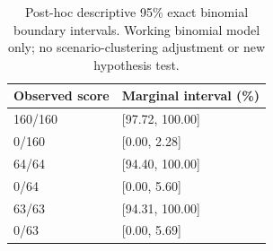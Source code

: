 \begin{table}[t]
\centering
\caption{Post-hoc descriptive 95\% exact binomial boundary intervals. Working binomial model only; no scenario-clustering adjustment or new hypothesis test.}
\label{tab:s-marginal}
\begin{tabular}{@{}ll@{}}
\toprule
Observed score & Marginal interval (\%) \\
\midrule
160/160 & [97.72, 100.00] \\
0/160 & [0.00, 2.28] \\
64/64 & [94.40, 100.00] \\
0/64 & [0.00, 5.60] \\
63/63 & [94.31, 100.00] \\
0/63 & [0.00, 5.69] \\
\bottomrule
\end{tabular}
\end{table}
